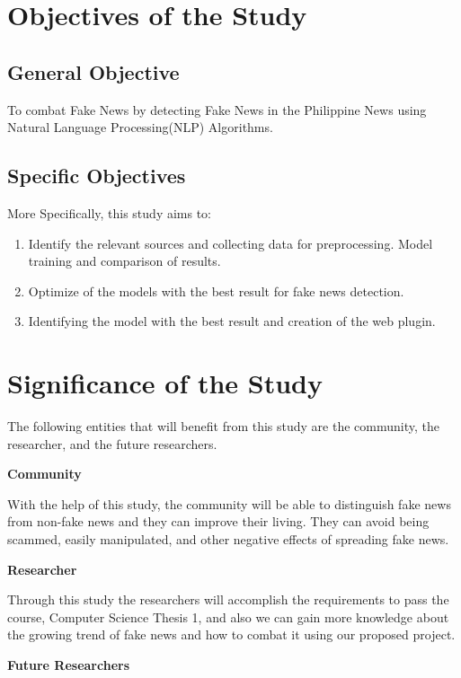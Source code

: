 \begin{refsection}
\section{Objectives of the Study}

\subsection{General Objective}

To combat Fake News by detecting Fake News in the Philippine News using Natural Language Processing(NLP) Algorithms.

\subsection{Specific Objectives}

More Specifically, this study aims to:

\begin{enumerate}
    \item Identify the relevant sources and collecting data for preprocessing. Model training and comparison of results.
    \item Optimize of the models with the best result for fake news detection.
    \item Identifying the model with the best result and creation of the web plugin.
\end{enumerate}


\section{Significance of the Study}

The following entities that will benefit from this study are the community, the researcher, and the future researchers.

{\bf Community}

With the help of this study, the community will be able to distinguish fake news from non-fake news and they can improve their living. They can avoid being scammed, easily manipulated, and other negative effects of spreading fake news.


{\bf Researcher}

Through this study the researchers will accomplish the requirements to pass the course, Computer Science Thesis 1, and also we can gain more knowledge about the growing trend of fake news and how to combat it using our proposed project.


{\bf Future Researchers}


\end{refsection}
